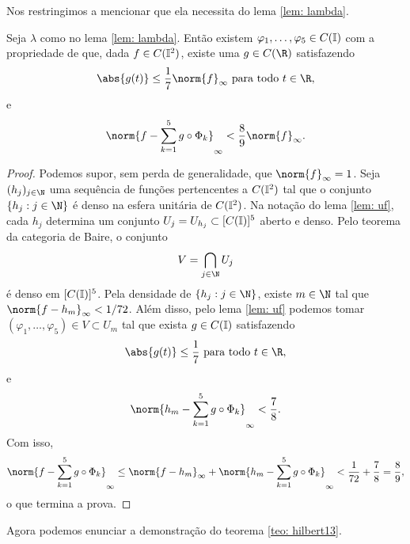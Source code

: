Nos restringimos a mencionar que ela necessita do lema \ref{lem: lambda}.
\begin{lem}
    Seja \( \lambda \) como no lema \ref{lem: lambda}.
    Então existem \( \varphi_{ 1 }, \dots, \varphi_{ 5 } \in C(\mathbb{I}) \) com a propriedade de que, dada \( f \in C(\mathbb{I}^2) \), existe uma \( g \in C(\R) \) satisfazendo \[
        \abs{ g(t) } \leq \frac{ 1 }{ 7 } \norm{ f }_{ \infty } \text{ para todo } t \in \R
    ,\]
    e \[
        \norm{ 
            f - \sum_{ k=1 }^{ 5 } g \circ \Phi_{ k }
         }_{ \infty } < \frac{ 8 }{ 9 } \norm{ f }_{ \infty }
    .\]
    \label{lem: baire}
\end{lem}
\begin{proof}
    Podemos supor, sem perda de generalidade, que \( \norm{ f }_{ \infty } = 1 \).
    Seja \( (h_{ j })_{ j\in\N } \) uma sequência de funções pertencentes a \( C(\mathbb{I}^2) \) tal que o conjunto \( \left\{ h_{ j } : j\in \N \right\} \) é denso na esfera unitária de \( C(\mathbb{I}^2) \).
    Na notação do lema \ref{lem: uf}, cada \( h_{ j } \) determina um conjunto \( U_{ j } = U_{ h_{ j } } \subset  [C(\mathbb{I})]^{ 5 } \) aberto e denso.
    Pelo teorema da categoria de Baire, o conjunto \[
        V = \bigcap_{ j\in\N } U_{ j }
    \]
    é denso em \( [C(\mathbb{I})]^{ 5 } \).
    Pela densidade de \( \left\{ h_{ j } : j \in \N \right\} \), existe \( m \in \N \) tal que \( \norm{ f - h_{ m } }_{ \infty } < 1/72 \).
    Além disso, pelo lema \ref{lem: uf} podemos tomar \( ( \varphi_{ 1 }, \dots, \varphi_{ 5 } ) \in V \subset  U_{ m } \) tal que exista \( g \in C(\mathbb{I}) \) satisfazendo \[
        \abs{ g(t) } \leq \frac{ 1 }{ 7 } \text{ para todo } t \in \R
    ,\]
    e \[
        \norm{ 
            h_{ m } - \sum_{ k=1 }^{ 5 } g \circ \Phi_{ k }
         }_{ \infty } < \frac{ 7 }{ 8 }
    .\]
    Com isso, \[
        \norm{ 
            f - \sum_{ k=1 }^{ 5 } g \circ \Phi_{ k }
         }_{ \infty } \leq
        \norm{ f - h_{ m } }_{ \infty }
        + \norm{ 
            h_{ m } - \sum_{ k=1 }^{ 5 } g \circ \Phi_{ k }
         }_{ \infty }
         < \frac{ 1 }{ 72 } + \frac{ 7 }{ 8 }
         = \frac{ 8 }{ 9 }
    ,\]
    o que termina a prova.
\end{proof}
Agora podemos enunciar a demonstração do teorema \ref{teo: hilbert13}.
